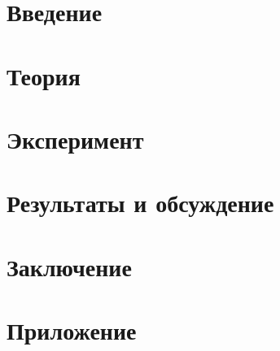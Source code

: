 \documentclass[oneside,final,14pt]{extreport}
\begin{document}
	
	
	\tableofcontents
	
	\chapter*{Введение}
	
	
	
	\chapter{Теория}
	
	
	\chapter{Эксперимент}
	
	
	\chapter{Результаты и обсуждение}
	
	\chapter*{Заключение}
	
	
	
	
	
	\chapter*{Приложение}
	
\end{document}

